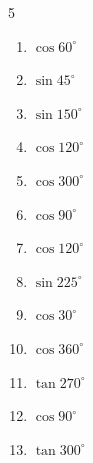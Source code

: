 \begin{multicols}{5}
\begin{enumerate}
  \item $\displaystyle \cos{60^\circ}$


  \item $\displaystyle \sin{45^\circ}$


  \item $\displaystyle \sin{150^\circ}$


  \item $\displaystyle \cos{120^\circ}$


  \item $\displaystyle \cos{300^\circ}$


\columnbreak %

  \item $\displaystyle \cos{90^\circ}$

        \phantom{$\displaystyle =0$}

  \item $\displaystyle \cos{120^\circ}$


  \item $\displaystyle \sin{225^\circ}$


  \item $\displaystyle \cos{30^\circ}$


  \item $\displaystyle \cos{360^\circ}$

        \phantom{$\displaystyle =1$}

  \item $\displaystyle \tan{270^\circ}$

        \phantom{$\displaystyle なし$}

  \item $\displaystyle \cos{90^\circ}$

        \phantom{$\displaystyle =0$}

  \item $\displaystyle \tan{300^\circ}$


\end{enumerate}
\end{multicols}
